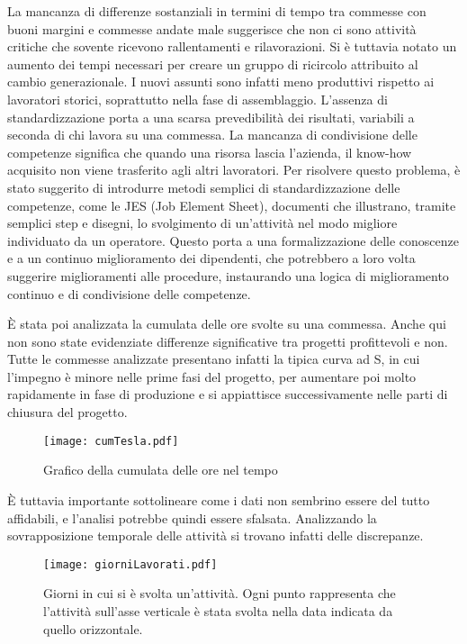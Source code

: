 \begin{multicols}{2}
	La mancanza di differenze sostanziali in termini di tempo tra commesse con buoni margini e commesse andate male suggerisce che non ci sono attività critiche che sovente ricevono rallentamenti e rilavorazioni.
	Si è tuttavia notato un aumento dei tempi necessari per creare un gruppo di ricircolo attribuito al cambio generazionale. I nuovi assunti sono infatti meno produttivi rispetto ai lavoratori storici, soprattutto nella fase di assemblaggio. L’assenza di standardizzazione porta a una scarsa prevedibilità dei risultati, variabili a seconda di chi lavora su una commessa.
	La mancanza di condivisione delle competenze significa che quando una risorsa lascia l’azienda, il know-how acquisito non viene trasferito agli altri lavoratori.
	Per risolvere questo problema, è stato suggerito di introdurre metodi semplici di standardizzazione delle competenze, come le JES (Job Element Sheet), documenti che illustrano, tramite semplici step e disegni, lo svolgimento di un’attività nel modo migliore individuato da un operatore. Questo porta a una formalizzazione delle conoscenze e a un continuo miglioramento dei dipendenti, che potrebbero a loro volta suggerire miglioramenti alle procedure, instaurando una logica di miglioramento continuo e di condivisione delle competenze.

	È stata poi analizzata la cumulata delle ore svolte su una commessa. Anche qui non sono state evidenziate differenze significative tra progetti profittevoli e non. Tutte le commesse analizzate presentano infatti la tipica curva ad S, in cui l’impegno è minore nelle prime fasi del progetto, per aumentare poi molto rapidamente in fase di produzione e si appiattisce successivamente nelle parti di chiusura del progetto.
\end{multicols}

\begin{figure}[H]
	\centering
	\texttt{[image: cumTesla.pdf]}
	\caption{Grafico della cumulata delle ore nel tempo}
\end{figure}

\begin{multicols}{2}
	È tuttavia importante sottolineare come i dati non sembrino essere del tutto affidabili, e l'analisi potrebbe quindi essere sfalsata. Analizzando la sovrapposizione temporale delle attività si trovano infatti delle discrepanze.
\end{multicols}

\begin{figure}[H]
	\centering
	\texttt{[image: giorniLavorati.pdf]}
	\caption{Giorni in cui si è svolta un'attività. Ogni punto rappresenta che l'attività sull'asse verticale è stata svolta nella data indicata da quello orizzontale.}
\end{figure}

